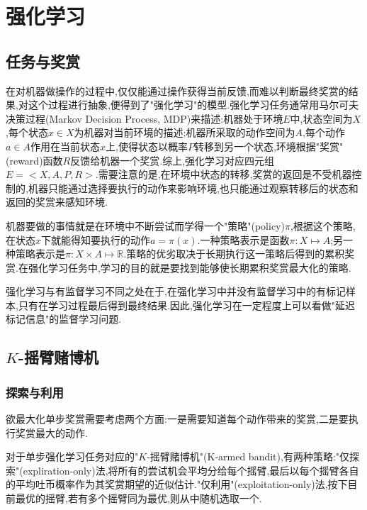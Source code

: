 \chapter{强化学习}

\section{任务与奖赏}

在对机器做操作的过程中,仅仅能通过操作获得当前反馈,而难以判断最终奖赏的结果,对这个过程进行抽象,便得到了"强化学习"的模型.强化学习任务通常用马尔可夫决策过程(Markov Decision Process, MDP)来描述:机器处于环境$E$中,状态空间为$X$,每个状态$x\in X$为机器对当前环境的描述;机器所采取的动作空间为$A$,每个动作$a\in A$作用在当前状态$x$上,使得状态以概率$P$转移到另一个状态,环境根据"奖赏"(reward)函数$R$反馈给机器一个奖赏.综上,强化学习对应四元组$E=<X,A,P,R>$.需要注意的是,在环境中状态的转移,奖赏的返回是不受机器控制的,机器只能通过选择要执行的动作来影响环境,也只能通过观察转移后的状态和返回的奖赏来感知环境.

机器要做的事情就是在环境中不断尝试而学得一个"策略"(policy)$\pi$,根据这个策略,在状态$x$下就能得知要执行的动作$a=\pi(x)$.一种策略表示是函数$\pi:X\mapsto A$;另一种策略表示是$\pi:X\times A\mapsto \mathbb R$.策略的优劣取决于长期执行这一策略后得到的累积奖赏.在强化学习任务中,学习的目的就是要找到能够使长期累积奖赏最大化的策略.

强化学习与有监督学习不同之处在于,在强化学习中并没有监督学习中的有标记样本,只有在学习过程最后得到最终结果.因此,强化学习在一定程度上可以看做"延迟标记信息"的监督学习问题.

\section{$K$-摇臂赌博机}

\subsection{探索与利用}

欲最大化单步奖赏需要考虑两个方面:一是需要知道每个动作带来的奖赏,二是要执行奖赏最大的动作.

对于单步强化学习任务对应的"$K$-摇臂赌博机"(K-armed bandit),有两种策略:"仅探索"(expliration-only)法,将所有的尝试机会平均分给每个摇臂,最后以每个摇臂各自的平均吐币概率作为其奖赏期望的近似估计."仅利用"(exploitation-only)法,按下目前最优的摇臂,若有多个摇臂同为最优,则从中随机选取一个.

